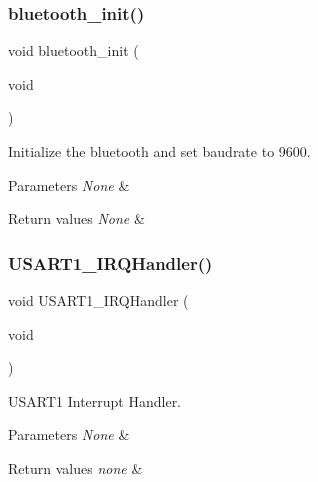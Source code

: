 \subsubsection{\texorpdfstring{bluetooth\+\_\+init()}{bluetooth\_init()}}
{\footnotesize\ttfamily void bluetooth\+\_\+init (\begin{DoxyParamCaption}\item[{void}]{ }\end{DoxyParamCaption})}



Initialize the bluetooth and set baudrate to 9600. 


\begin{DoxyParams}{Parameters}
{\em None} & \\
\hline
\end{DoxyParams}

\begin{DoxyRetVals}{Return values}
{\em None} & \\
\hline
\end{DoxyRetVals}
\mbox{\label{group___initialization_ga7139cd4baabbbcbab0c1fe6d7d4ae1cc}} 
\subsubsection{\texorpdfstring{U\+S\+A\+R\+T1\+\_\+\+I\+R\+Q\+Handler()}{USART1\_IRQHandler()}}
{\footnotesize\ttfamily void U\+S\+A\+R\+T1\+\_\+\+I\+R\+Q\+Handler (\begin{DoxyParamCaption}\item[{void}]{ }\end{DoxyParamCaption})}



U\+S\+A\+R\+T1 Interrupt Handler. 


\begin{DoxyParams}{Parameters}
{\em None} & \\
\hline
\end{DoxyParams}

\begin{DoxyRetVals}{Return values}
{\em none} & \\
\hline
\end{DoxyRetVals}
